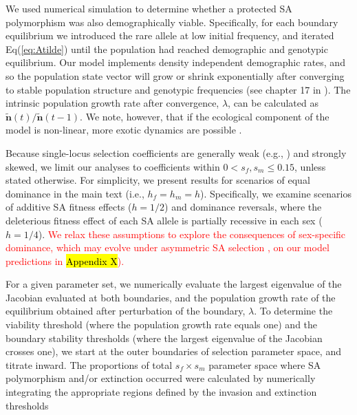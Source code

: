 \documentclass[11pt,draft]{article}
\def\mbf#1{\mathbf{#1}}
\begin{document}
We used numerical simulation to determine whether a protected SA polymorphism was also demographically viable. Specifically, for each boundary equilibrium we introduced the rare allele at low initial frequency, and iterated Eq(\ref{eq:Atilde}) until the population had reached demographic and genotypic equilibrium. Our model implements density independent demographic rates, and so the population state vector will grow or shrink exponentially after converging to stable population structure and genotypic frequencies (see chapter 17 in \citealt{Caswell2001}). The intrinsic population growth rate after convergence, $\lambda$, can be calculated as $\tilde{\mbf{n}}(t)/\tilde{\mbf{n}}(t-1)$. We note, however, that if the ecological component of the model is non-linear, more exotic dynamics are possible \citep{de2020matrix}.

Because single-locus selection coefficients are generally weak (e.g., \citealt{Eyre-WalkerKeightly2007}) and strongly skewed, we limit our analyses to coefficients within $0 < s_f,s_m \leq 0.15$, unless stated otherwise. For simplicity, we present results for scenarios of equal dominance in the main text (i.e., $h_f = h_m = h$). Specifically, we examine scenarios of additive SA fitness effects ($h = 1/2$) and dominance reversals, where the deleterious fitness effect of each SA allele is partially recessive in each sex ($h = 1/4$). \textcolor{red}{We relax these assumptions to explore the consequences of sex-specific dominance, which may evolve under asymmetric SA selection \citep{SpencerPriest2016}, on our model predictions in \hl{Appendix X}). }

For a given parameter set, we numerically evaluate the largest eigenvalue of the Jacobian evaluated at both boundaries, and the population growth rate of the equilibrium obtained after perturbation of the boundary, $\lambda$. To determine the viability threshold (where the population growth rate equals one) and the boundary stability thresholds (where the largest eigenvalue of the Jacobian crosses one), we start at the outer boundaries of selection parameter space, and titrate inward. The proportions of total $s_f \times s_m$ parameter space where SA polymorphism and/or extinction occurred were calculated by numerically integrating the appropriate regions defined by the invasion and extinction thresholds
\end{document}
